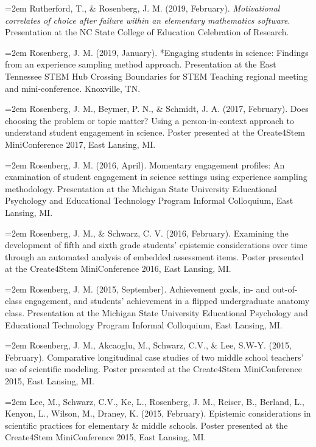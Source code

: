 \documentclass[14,]{article}
\begin{document}
\hangindent=2em Rutherford, T., \& Rosenberg, J. M. (2019, February).
\emph{Motivational correlates of choice after failure within an
elementary mathematics software}. Presentation at the NC State College
of Education Celebration of Research.

\hangindent=2em Rosenberg, J. M. (2019, January). *Engaging students in
science: Findings from an experience sampling method approach.
Presentation at the East Tennessee STEM Hub Crossing Boundaries for STEM
Teaching regional meeting and mini-conference. Knoxville, TN.

\hangindent=2em Rosenberg, J. M., Beymer, P. N., \& Schmidt, J. A.
(2017, February). Does choosing the problem or topic matter? Using a
person-in-context approach to understand student engagement in science.
Poster presented at the Create4Stem MiniConference 2017, East Lansing,
MI.

\hangindent=2em Rosenberg, J. M. (2016, April). Momentary engagement
profiles: An examination of student engagement in science settings using
experience sampling methodology. Presentation at the Michigan State
University Educational Psychology and Educational Technology Program
Informal Colloquium, East Lansing, MI.

\hangindent=2em Rosenberg, J. M., \& Schwarz, C. V. (2016, February).
Examining the development of fifth and sixth grade students' epistemic
considerations over time through an automated analysis of embedded
assessment items. Poster presented at the Create4Stem MiniConference
2016, East Lansing, MI.

\hangindent=2em Rosenberg, J. M. (2015, September). Achievement goals,
in- and out-of-class engagement, and students' achievement in a flipped
undergraduate anatomy class. Presentation at the Michigan State
University Educational Psychology and Educational Technology Program
Informal Colloquium, East Lansing, MI.

\hangindent=2em Rosenberg, J. M., Akcaoglu, M., Schwarz, C.V., \& Lee,
S.W-Y. (2015, February). Comparative longitudinal case studies of two
middle school teachers' use of scientific modeling. Poster presented at
the Create4Stem MiniConference 2015, East Lansing, MI.

\hangindent=2em Lee, M., Schwarz, C.V., Ke, L., Rosenberg, J. M.,
Reiser, B., Berland, L., Kenyon, L., Wilson, M., Draney, K. (2015,
February). Epistemic considerations in scientific practices for
elementary \& middle schools. Poster presented at the Create4Stem
MiniConference 2015, East Lansing, MI.
\end{document}
